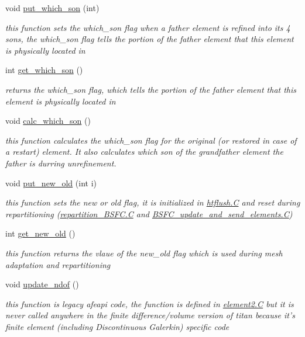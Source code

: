 \begin{CompactItemize}
void \hyperlink{classElement_a44}{put\_\-which\_\-son} (int)
\begin{CompactList}\small\item\em this function sets the which\_\-son flag when a father element is refined into its 4 sons, the which\_\-son flag tells the portion of the father element that this element is physically located in \item\end{CompactList}\item 
int \hyperlink{classElement_a45}{get\_\-which\_\-son} ()
\begin{CompactList}\small\item\em returns the which\_\-son flag, which tells the portion of the father element that this element is physically located in \item\end{CompactList}\item 
void \hyperlink{classElement_a46}{calc\_\-which\_\-son} ()
\begin{CompactList}\small\item\em this function calculates the which\_\-son flag for the original (or restored in case of a restart) element. It also calculates which son of the grandfather element the father is durring unrefinement. \item\end{CompactList}\item 
void \hyperlink{classElement_a47}{put\_\-new\_\-old} (int i)
\begin{CompactList}\small\item\em this function sets the new or old flag, it is initialized in \hyperlink{constant_8h_a21}{htflush.C} and reset during repartitioning (\hyperlink{constant_8h_a21}{repartition\_\-BSFC.C} and \hyperlink{constant_8h_a21}{BSFC\_\-update\_\-and\_\-send\_\-elements.C}) \item\end{CompactList}\item 
int \hyperlink{classElement_a48}{get\_\-new\_\-old} ()
\begin{CompactList}\small\item\em this function returns the vlaue of the new\_\-old flag which is used during mesh adaptation and repartitioning \item\end{CompactList}\item 
void \hyperlink{classElement_a49}{update\_\-ndof} ()
\begin{CompactList}\small\item\em this function is legacy afeapi code, the function is defined in \hyperlink{constant_8h_a21}{element2.C} but it is never called anywhere in the finite difference/volume version of titan because it's finite element (including Discontinuous Galerkin) specific code \item\end{CompactList}\item 

\end{CompactItemize}
